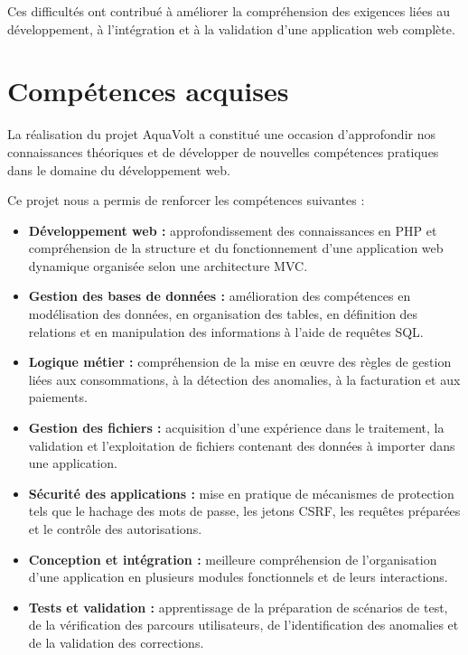 Ces difficultés ont contribué à améliorer la compréhension des exigences liées au développement, à l'intégration et à la validation d'une application web complète.

\section{Compétences acquises}

La réalisation du projet AquaVolt a constitué une occasion d'approfondir nos connaissances théoriques et de développer de nouvelles compétences pratiques dans le domaine du développement web.

Ce projet nous a permis de renforcer les compétences suivantes :

\begin{itemize}
    \item \textbf{Développement web :} approfondissement des connaissances en PHP et compréhension de la structure et du fonctionnement d'une application web dynamique organisée selon une architecture MVC.

    \item \textbf{Gestion des bases de données :} amélioration des compétences en modélisation des données, en organisation des tables, en définition des relations et en manipulation des informations à l'aide de requêtes SQL.

    \item \textbf{Logique métier :} compréhension de la mise en œuvre des règles de gestion liées aux consommations, à la détection des anomalies, à la facturation et aux paiements.

    \item \textbf{Gestion des fichiers :} acquisition d'une expérience dans le traitement, la validation et l'exploitation de fichiers contenant des données à importer dans une application.

    \item \textbf{Sécurité des applications :} mise en pratique de mécanismes de protection tels que le hachage des mots de passe, les jetons CSRF, les requêtes préparées et le contrôle des autorisations.

    \item \textbf{Conception et intégration :} meilleure compréhension de l'organisation d'une application en plusieurs modules fonctionnels et de leurs interactions.

    \item \textbf{Tests et validation :} apprentissage de la préparation de scénarios de test, de la vérification des parcours utilisateurs, de l'identification des anomalies et de la validation des corrections.


\end{itemize}
